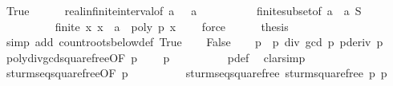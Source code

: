 \begin{isabellebody}
\ True\isanewline
\ \ \ \ \isamarkupfalse%
\ real{\isacharunderscore}infinite{\isacharunderscore}interval{\isacharbrackleft}of\ {\isachardoublequoteopen}a\ {\isacharminus}\ {}{\isachardoublequoteclose}\ a{\isacharbrackright}\ \isanewline
\ \ \ \ \ \ \ \ \ finite{\isacharunderscore}subset{\isacharbrackleft}of\ {\isachardoublequoteopen}{\isacharbraceleft}a\ {\isacharminus}\ {}{\isacharless}{\isachardot}{\isachardot}{\isacharless}a{\isacharbraceright}{\isachardoublequoteclose}\ {\isacharquery}S{\isacharbrackright}\isanewline
\ \ \ \ \ \ \ \ \isamarkupfalse%
\ {\isachardoublequoteopen}{\isasymnot}finite\ {\isacharbraceleft}x{\isachardot}\ x\ {\isasymle}\ a\ {\isasymand}\ poly\ p\ x\ {\isacharequal}\ {}{\isacharbraceright}{\isachardoublequoteclose}\ \isamarkupfalse%
\ force\isanewline
\ \ \ \ \isamarkupfalse%
\ {\isacharquery}thesis\ \isamarkupfalse%
\ {\isacharparenleft}simp\ add{\isacharcolon}\ count{\isacharunderscore}roots{\isacharunderscore}below{\isacharunderscore}def\ True{\isacharparenright}\isanewline
{}\isamarkupfalse%
\isanewline
\ \ \isamarkupfalse%
\ False\isanewline
\ \ \isamarkupfalse%
\ p{\isacharprime}\ {\isasymequiv}\ {\isachardoublequoteopen}p\ div\ {\isacharparenleft}gcd\ p\ {\isacharparenleft}pderiv\ p{\isacharparenright}{\isacharparenright}{\isachardoublequoteclose}\isanewline
\ \ \isamarkupfalse%
\ poly{\isacharunderscore}div{\isacharunderscore}gcd{\isacharunderscore}squarefree{\isacharparenleft}{}{\isacharparenright}{\isacharbrackleft}OF\ {\isacharbackquoteopen}p\ {\isasymnoteq}\ {}{\isacharbackquoteclose}{\isacharbrackright}\ \isamarkupfalse%
\ {\isachardoublequoteopen}p{\isacharprime}\ {\isasymnoteq}\ {}{\isachardoublequoteclose}\isanewline
\ \ \ \ \ \ \isamarkupfalse%
\ p{\isacharprime}{\isacharunderscore}def\ \isamarkupfalse%
\ clarsimp\isanewline
\isanewline
\ \ \isamarkupfalse%
\ sturm{\isacharunderscore}seq{\isacharunderscore}squarefree{\isacharbrackleft}OF\ {\isacharbackquoteopen}p\ {\isasymnoteq}\ {}{\isacharbackquoteclose}{\isacharbrackright}\isanewline
\ \ \ \ \ \ \isamarkupfalse%
\ sturm{\isacharunderscore}seq{\isacharunderscore}squarefree\ {\isachardoublequoteopen}sturm{\isacharunderscore}squarefree\ p{\isachardoublequoteclose}\ p{\isacharprime}\isanewline
\ \ \ \ \ \ \isamarkupfalse%

\end{isabellebody}
